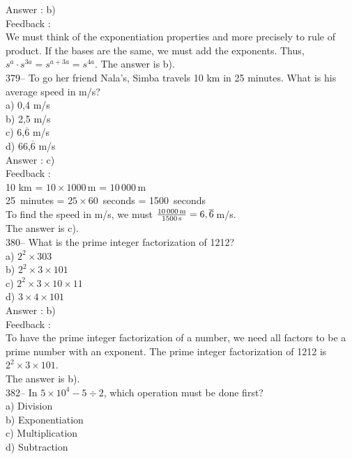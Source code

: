 ﻿\documentclass[letterpaper, 12pt]{article}
\begin{document}
Answer : b)\\

Feedback : \\
We must think of the exponentiation properties and more precisely to rule of product. If the bases are the same, we must add the exponents. Thus, $s^{a}\cdot s^{3a}=s^{a+3a}=s^{4a}$. The answer is b).\\

379-- To go her friend Nala's, Simba travels 10 km in 25 minutes.
  What is his average speed in m/s?\\
a) 0,4 m/s\\
b) 2,5 m/s\\
c) 6,$\overline{6}$ m/s\\
d) 66,$\overline{6}$ m/s\\

Answer : c)\\

Feedback : \\
10 km = $10\times1000$\,m = $10\,000$\,m\\
25~minutes = $25\times60$~seconds = 1500~seconds\\
To find the speed in m/s, we must
$\frac{10\,000\textrm{\,m}}{1500\textrm{\,s}}=6,\overline{6}$\,m/s.\\
The answer is c).\\

380-- What is the prime integer factorization of 1212?\\
a) $2^{2}\times303$\\
b) $2^{2}\times3\times101$\\
c) $2^{2}\times3\times10\times11$\\
d) $3\times4\times101$\\


Answer : b)\\

Feedback : \\
To have the prime integer factorization of a number, we need all factors to be a prime number with an exponent. The prime integer factorization of 1212 is $2^{2}\times3\times101$.\\  The answer is b).\\


382-- In $5\times10^{4}-5\div2$, which operation must be done first?\\
a) Division\\
b) Exponentiation\\
c) Multiplication\\
d) Subtraction\\
\end{document}
